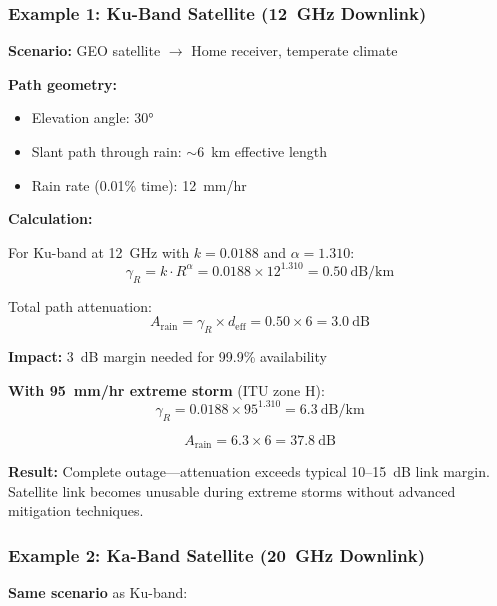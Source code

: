 \subsubsection{Example 1: Ku-Band Satellite (12~GHz Downlink)}

\textbf{Scenario:} GEO satellite $\rightarrow$ Home receiver, temperate climate

\textbf{Path geometry:}
\begin{itemize}
\item Elevation angle: $30°$
\item Slant path through rain: $\sim$6~km effective length
\item Rain rate (0.01\% time): 12~mm/hr
\end{itemize}

\textbf{Calculation:}

For Ku-band at 12~GHz with $k = 0.0188$ and $\alpha = 1.310$:
\begin{equation}
\gamma_R = k \cdot R^\alpha = 0.0188 \times 12^{1.310} = 0.50~\text{dB/km}
\end{equation}

Total path attenuation:
\begin{equation}
A_{\text{rain}} = \gamma_R \times d_{\text{eff}} = 0.50 \times 6 = 3.0~\text{dB}
\end{equation}

\textbf{Impact:} 3~dB margin needed for 99.9\% availability

\textbf{With 95~mm/hr extreme storm} (ITU zone H):
\begin{equation}
\gamma_R = 0.0188 \times 95^{1.310} = 6.3~\text{dB/km}
\end{equation}

\begin{equation}
A_{\text{rain}} = 6.3 \times 6 = 37.8~\text{dB}
\end{equation}

\begin{warningbox}
\textbf{Result:} Complete outage---attenuation exceeds typical 10--15~dB link margin. Satellite link becomes unusable during extreme storms without advanced mitigation techniques.
\end{warningbox}

\subsubsection{Example 2: Ka-Band Satellite (20~GHz Downlink)}

\textbf{Same scenario} as Ku-band:


